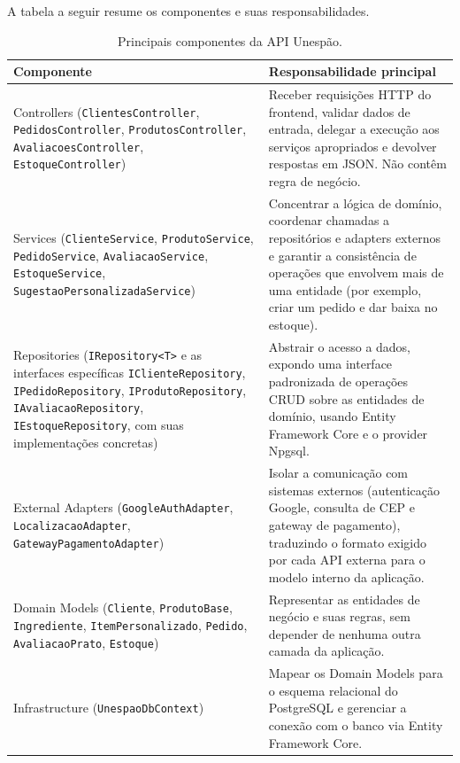 \documentclass[a4paper,12pt,oneside,openany]{book}
\begin{document}
A tabela a seguir resume os componentes e suas responsabilidades.

\begin{table}[H]
\centering
\caption{Principais componentes da API Unespão.}
\begin{tabularx}{0.95\textwidth}{p{} X}
\toprule
\textbf{Componente} & \textbf{Responsabilidade principal} \\
\midrule
Controllers (\texttt{ClientesController}, \texttt{PedidosController}, \texttt{ProdutosController}, \texttt{AvaliacoesController}, \texttt{EstoqueController}) & Receber requisições HTTP do frontend, validar dados de entrada, delegar a execução aos serviços apropriados e devolver respostas em JSON. Não contêm regra de negócio. \\
Services (\texttt{ClienteService}, \texttt{ProdutoService}, \texttt{PedidoService}, \texttt{AvaliacaoService}, \texttt{EstoqueService}, \texttt{SugestaoPersonalizadaService}) & Concentrar a lógica de domínio, coordenar chamadas a repositórios e adapters externos e garantir a consistência de operações que envolvem mais de uma entidade (por exemplo, criar um pedido e dar baixa no estoque). \\
Repositories (\texttt{IRepository<T>} e as interfaces específicas \texttt{IClienteRepository}, \texttt{IPedidoRepository}, \texttt{IProdutoRepository}, \texttt{IAvaliacaoRepository}, \texttt{IEstoqueRepository}, com suas implementações concretas) & Abstrair o acesso a dados, expondo uma interface padronizada de operações CRUD sobre as entidades de domínio, usando Entity Framework Core e o provider Npgsql. \\
External Adapters (\texttt{GoogleAuthAdapter}, \texttt{LocalizacaoAdapter}, \texttt{GatewayPagamentoAdapter}) & Isolar a comunicação com sistemas externos (autenticação Google, consulta de CEP e gateway de pagamento), traduzindo o formato exigido por cada API externa para o modelo interno da aplicação. \\
Domain Models (\texttt{Cliente}, \texttt{ProdutoBase}, \texttt{Ingrediente}, \texttt{ItemPersonalizado}, \texttt{Pedido}, \texttt{AvaliacaoPrato}, \texttt{Estoque}) & Representar as entidades de negócio e suas regras, sem depender de nenhuma outra camada da aplicação. \\
Infrastructure (\texttt{UnespaoDbContext}) & Mapear os Domain Models para o esquema relacional do PostgreSQL e gerenciar a conexão com o banco via Entity Framework Core. \\
\bottomrule
\end{tabularx}
\end{table}
\end{document}
